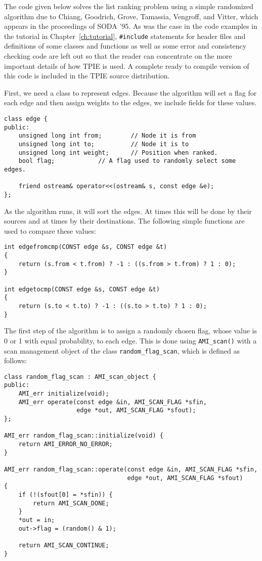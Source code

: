 The code given below solves the list ranking problem using a simple
randomized algorithm due to Chiang, Goodrich, Grove, Tamassia,
Vengroff, and Vitter, which appears in the proceedings of SODA '95.
As was the case in the code examples in the tutorial in
Chapter~\ref{ch:tutorial}, \verb|#include| statements
for header files and definitions of some classes and functions as well
as some error and consistency checking code are left out so that the
reader can concentrate on the more important details of how TPIE is
used.  A complete ready to compile version of this code is included in
the TPIE source distribution.

First, we need a class to represent edges.  Because the algorithm will
set a flag for each edge and then assign weights to the edges, we
include fields for these values.

\begin{verbatim}
class edge {
public:
    unsigned long int from;        // Node it is from
    unsigned long int to;          // Node it is to
    unsigned long int weight;      // Position when ranked.
    bool flag;            // A flag used to randomly select some edges.

    friend ostream& operator<<(ostream& s, const edge &e);
};    
\end{verbatim}

As the algorithm runs, it will sort the edges.  At times this will be
done by their sources and at times by their destinations.  The
following simple functions are used to compare these values:

\begin{verbatim}
int edgefromcmp(CONST edge &s, CONST edge &t)
{
    return (s.from < t.from) ? -1 : ((s.from > t.from) ? 1 : 0);
}
  
int edgetocmp(CONST edge &s, CONST edge &t)
{
    return (s.to < t.to) ? -1 : ((s.to > t.to) ? 1 : 0);
}
\end{verbatim}

The first step of the algorithm is to assign a randomly chosen flag,
whose value is 0 or 1 with equal probability, to each edge.  This is
done using \verb|AMI_scan()| with a scan management object of the
class \verb|random_flag_scan|, which is defined as follows:

\begin{verbatim}
class random_flag_scan : AMI_scan_object {
public:
    AMI_err initialize(void);  
    AMI_err operate(const edge &in, AMI_SCAN_FLAG *sfin,
                    edge *out, AMI_SCAN_FLAG *sfout);
};

AMI_err random_flag_scan::initialize(void) {
    return AMI_ERROR_NO_ERROR;
}

AMI_err random_flag_scan::operate(const edge &in, AMI_SCAN_FLAG *sfin,
                                  edge *out, AMI_SCAN_FLAG *sfout)
{ 
    if (!(sfout[0] = *sfin)) {
        return AMI_SCAN_DONE;
    }
    *out = in;
    out->flag = (random() & 1);
    
    return AMI_SCAN_CONTINUE;
}
\end{verbatim}

